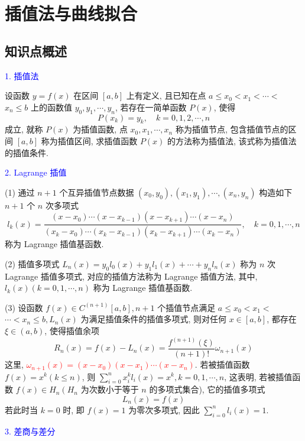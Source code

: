 \newpage
\section{插值法与曲线拟合}

\subsection{知识点概述}
\textcolor{blue}{1. 插值法}

设函数 $ y=f(x) $ 在区间 $ [a, b] $ 上有定义, 且已知在点 $ a \leqslant x_{0}<x_{1}<\cdots< $ $ x_{n} \leqslant b $ 上的函数值 $ y_{0}, y_{1}, \cdots, y_{n} $, 若存在一简单函数 $ P(x) $, 使得
$$
P\left(x_{k}\right)=y_{k}, \quad k=0,1,2, \cdots, n
$$
成立, 就称 $ P(x) $ 为插值函数, 点 $ x_{0}, x_{1}, \cdots, x_{n} $ 称为插值节点, 包含插值节点的区间 $ [a, b] $ 称为插值区间, 求插值函数 $ P(x) $ 的方法称为插值法, 该式称为插值法的插值条件.

\textcolor{blue}{2. Lagrange 插值}

(1) 通过 $ n+1 $ 个互异插值节点数据 $ \left(x_{0}, y_{0}\right),\left(x_{1}, y_{1}\right), \cdots,\left(x_{n}, y_{n}\right) $ 构造如下 $ n+1 $ 个 $ n $ 次多项式
$$
l_{k}(x)=\frac{\left(x-x_{0}\right) \cdots\left(x-x_{k-1}\right)\left(x-x_{k+1}\right) \cdots\left(x-x_{n}\right)}{\left(x_{k}-x_{0}\right) \cdots\left(x_{k}-x_{k-1}\right)\left(x_{k}-x_{k+1}\right) \cdots\left(x_{k}-x_{n}\right)}, \quad k=0,1, \cdots, n
$$
称为 Lagrange 插值基函数.

(2) 插值多项式
$L_{n}(x)=y_{0} l_{0}(x)+y_{1} l_{1}(x)+\cdots+y_{n} l_{n}(x)$
称为 $ n $ 次 Lagrange 插值多项式, 对应的插值方法称为 Lagrange 插值方法, 其中, $ l_{k}(x)(k=0,1, \cdots, n) $ 称为 Lagrange 插值基函数.

(3) 设函数 $ f(x) \in C^{(n+1)}[a, b], n+1 $ 个插值节点满足 $ a \leqslant x_{0}<x_{1}< $ $ \cdots<x_{n} \leqslant b, L_{n}(x) $ 为满足插值条件的插值多项式, 则对任何 $ x \in[a, b] $, 都存在 $ \xi \in(a, b) $, 使得插值余项
$$
R_{n}(x)=f(x)-L_{n}(x)=\frac{f^{(n+1)}(\xi)}{(n+1)!} \omega_{n+1}(x)
$$
这里, \textcolor{red}{$ \omega_{n+1}(x)=\left(x-x_{0}\right)\left(x-x_{1}\right) \cdots\left(x-x_{n}\right) $}.
若被插值函数 $ f(x)=x^{k}(k \leqslant n) $, 则 $ \sum\limits_{i=0}^{n} x_{i}^{k} l_{i}(x)=x^{k}, k=0,1, \cdots, n $, 这表明, 若被插值函数 $ f(x) \in H_{n}\left(H_{n}\right. $ 为次数小于等于 $ n $ 的多项式集合), 它的插值多项式
$$
L_{n}(x)=f(x)
$$
若此时当 $ k=0 $ 时, 即 $ f(x)=1 $ 为零次多项式, 因此 $ \sum\limits_{i=0}^{n} l_{i}(x)=1 $.

\textcolor{blue}{3. 差商与差分}

